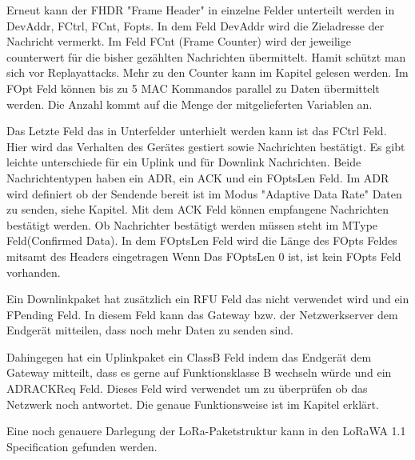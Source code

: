 \documentclass[a4paper,12pt]{article}
\begin{document}
            Erneut kann der FHDR "Frame Header" in einzelne Felder unterteilt werden in DevAddr, FCtrl, FCnt, Fopts. 
            In dem Feld DevAddr wird die Zieladresse der Nachricht vermerkt. Im Feld FCnt (Frame Counter) wird der 
            jeweilige counterwert für die bisher gezählten Nachrichten übermittelt. Hamit schützt man sich vor 
            Replayattacks. Mehr zu den Counter kann im Kapitel  gelesen werden. Im FOpt Feld 
            können bis zu 5 MAC Kommandos parallel zu Daten übermittelt werden. Die Anzahl kommt auf die Menge der 
            mitgelieferten Variablen an. 

            Das Letzte Feld das in Unterfelder unterhielt werden kann ist das FCtrl Feld. Hier wird das Verhalten des 
            Gerätes gestiert sowie Nachrichten bestätigt. Es gibt leichte unterschiede für ein Uplink und für Downlink 
            Nachrichten. Beide Nachrichtentypen haben ein ADR, ein ACK und ein FOptsLen Feld. Im ADR wird definiert 
            ob der Sendende bereit ist im Modus "Adaptive Data Rate" Daten zu senden, siehe Kapitel. 
            Mit dem ACK Feld können empfangene Nachrichten bestätigt werden. Ob Nachrichter bestätigt werden müssen 
            steht im MType Feld(Confirmed Data). In dem FOptsLen Feld wird die Länge des FOpts Feldes mitsamt des 
            Headers eingetragen Wenn Das FOptsLen 0 ist, ist kein FOpts Feld vorhanden.

            Ein Downlinkpaket hat zusätzlich ein RFU Feld das nicht verwendet wird und ein FPending Feld. In diesem 
            Feld kann das Gateway bzw. der Netzwerkserver dem Endgerät mitteilen, dass noch mehr Daten zu senden sind.

            Dahingegen hat ein Uplinkpaket ein ClassB Feld indem das Endgerät dem Gateway mitteilt, dass es gerne auf 
            Funktionsklasse B wechseln würde und ein ADRACKReq Feld. Dieses Feld wird verwendet um zu überprüfen ob 
            das Netzwerk noch antwortet. Die genaue Funktionsweise ist im Kapitel  erklärt.

            Eine noch genauere Darlegung der LoRa-Paketstruktur kann in den LoRaWA 1.1 Specification \cite{LoRaSpec} 
            gefunden werden.

            
            
\end{document}
